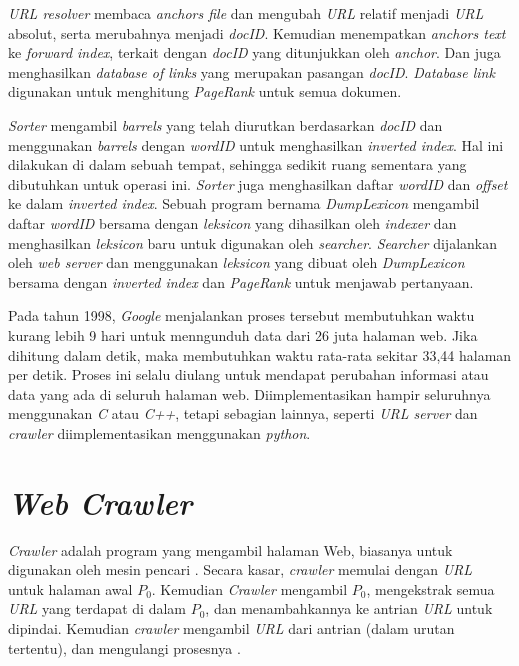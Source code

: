 \emph{URL resolver} membaca \emph{anchors file} dan mengubah \emph{URL} relatif menjadi \emph{URL} absolut, serta merubahnya menjadi \emph{docID}. Kemudian menempatkan \emph{anchors text} ke \emph{forward index}, terkait dengan \emph{docID} yang ditunjukkan oleh \emph{anchor}. Dan juga menghasilkan \emph{database of links} yang merupakan pasangan \emph{docID}. \emph{Database link} digunakan untuk menghitung \emph{PageRank} untuk semua dokumen.

\emph{Sorter} mengambil \emph{barrels} yang telah diurutkan berdasarkan \emph{docID} dan menggunakan \emph{barrels} dengan \emph{wordID} untuk menghasilkan \emph{inverted index}. Hal ini dilakukan di dalam sebuah tempat, sehingga sedikit ruang sementara yang dibutuhkan untuk operasi ini. \emph{Sorter} juga menghasilkan daftar \emph{wordID} dan \emph{offset} ke dalam \emph{inverted index}. Sebuah program bernama \emph{DumpLexicon} mengambil daftar \emph{wordID} bersama dengan \emph{leksicon} yang dihasilkan oleh \emph{indexer} dan menghasilkan \emph{leksicon} baru untuk digunakan oleh \emph{searcher}. \emph{Searcher} dijalankan oleh \emph{web server} dan menggunakan \emph{leksicon} yang dibuat oleh \emph{DumpLexicon} bersama dengan \emph{inverted index} dan \emph{PageRank} untuk menjawab pertanyaan.

Pada tahun 1998, \emph{Google} menjalankan proses tersebut membutuhkan waktu kurang lebih 9 hari untuk menngunduh data dari 26 juta halaman web. Jika dihitung dalam detik, maka membutuhkan waktu rata-rata sekitar 33,44 halaman per detik. Proses ini selalu diulang untuk mendapat perubahan informasi atau data yang ada di seluruh halaman web. Diimplementasikan hampir seluruhnya menggunakan \emph{C} atau \emph{C++}, tetapi sebagian lainnya, seperti \emph{URL server} dan \emph{crawler} diimplementasikan menggunakan \emph{python}.

\section{\emph{Web Crawler}}

\emph{Crawler} adalah program yang mengambil halaman Web, biasanya untuk digunakan oleh mesin pencari \cite{pinkerton1994finding}. Secara kasar, \emph{crawler} memulai dengan \emph{URL} untuk halaman awal $P_{0}$. Kemudian \emph{Crawler} mengambil $P_{0}$, mengekstrak semua \emph{URL} yang terdapat di dalam $P_{0}$, dan menambahkannya ke antrian \emph{URL} untuk dipindai. Kemudian \emph{crawler} mengambil \emph{URL} dari antrian (dalam urutan tertentu), dan mengulangi prosesnya \cite{cho1998efficient}.

